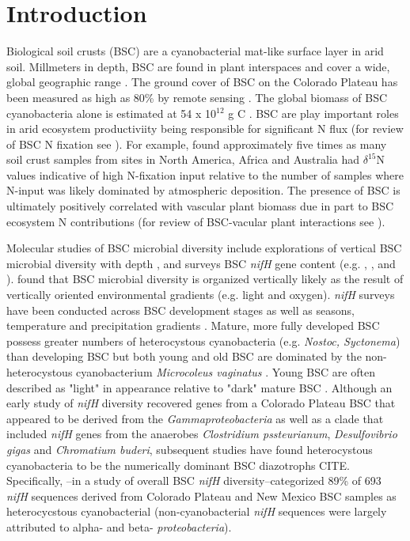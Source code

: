 \section{Introduction}


Biological soil crusts (BSC) are a cyanobacterial mat-like surface layer in arid soil. Millmeters in depth, BSC are found in plant interspaces and cover a wide, global geographic range \cite{garcia2003estimates}. The ground cover of BSC on the Colorado Plateau has been measured as high as 80\% by remote sensing \cite{karnieli2001}. The global biomass of BSC cyanobacteria alone is estimated at 54 x 10$^{12}$ g C \cite{garcia2003estimates}. BSC are play important roles in arid ecosystem productiviity being responsible for significant N flux (for review of BSC N fixation see \citet{belnap2003}). For example, \citet{Evans_1999} found approximately five times as many soil crust samples from sites in North America, Africa and Australia had $\delta^{15}$N values indicative of high N-fixation input relative to the number of samples where N-input was likely dominated by atmospheric deposition. The presence of BSC is ultimately positively correlated with vascular plant biomass due in part to BSC ecosystem N contributions (for review of BSC-vacular plant interactions see \citet{BelnapVascular}).

Molecular studies of BSC microbial diversity include explorations of vertical BSC microbial diversity with depth \cite{Garcia_Pichel_2003}, and surveys BSC \textit{nifH} gene content (e.g. \citet{14766579}, \citet{Yeager_2012}, \citet{Yeager} and \citet{Steppe_1996}). \citet{Garcia_Pichel_2003} found that BSC microbial diversity is organized vertically likely as the result of vertically oriented environmental gradients (e.g. light and oxygen). \textit{nifH} surveys have been conducted across BSC development stages \cite{14766579} as well as seasons, temperature and precipitation gradients \cite{Yeager_2012}. Mature, more fully developed BSC possess greater numbers of heterocystous cyanobacteria (e.g. \textit{Nostoc, Syctonema}) than developing BSC but both young and old BSC are dominated by the non-heterocystous cyanobacterium \textit{Microcoleus vaginatus} \cite{14766579}. Young BSC are often described as "light" in appearance relative to "dark" mature BSC \cite{Belnap_2002}.  Although an early study of \textit{nifH} diversity recovered genes from a Colorado Plateau BSC that appeared to be derived from the \textit{Gammaproteobacteria} as well as a clade that included \textit{nifH} genes from the anaerobes \textit{Clostridium pssteurianum}, \textit{Desulfovibrio gigas} and \textit{Chromatium buderi}, subsequent studies have found heterocystous cyanobacteria to be the numerically dominant BSC diazotrophs CITE. Specifically, \citet{Yeager}--in a study of overall BSC \textit{nifH} diversity--categorized 89\% of 693 \textit{nifH} sequences derived from Colorado Plateau and New Mexico BSC samples as heterocycstous cyanobacterial (non-cyanobacterial \textit{nifH} sequences were largely attributed to alpha- and beta- \textit{proteobacteria}).

